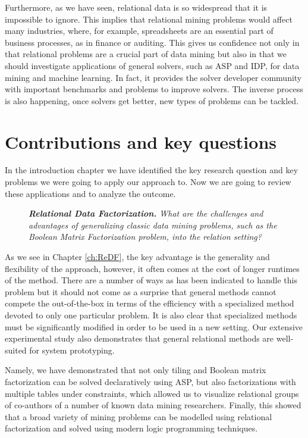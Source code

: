 Furthermore, as we have seen, relational data is so widespread that it is
impossible to ignore. This implies that relational mining problems
would affect many industries, where, for example, spreadsheets are
an essential part of business processes, as in finance or auditing.
This gives us confidence not only in that relational problems are a
crucial part of data mining but also in that we should investigate
applications of general solvers, such as ASP and IDP, for data mining
and machine learning. In fact, it provides the solver developer community
with important benchmarks and problems to improve solvers. The inverse
process is also happening, once solvers get better, new types of problems
can be tackled.

\section{Contributions and key questions}
In the introduction chapter we have identified the key research
question and key problems we were going to apply our approach to. Now
we are going to review these applications and to analyze the outcome.

\begin{description}
\item[\cone] \textit{\textbf{Relational Data Factorization.} What are the challenges and advantages of generalizing classic data mining problems, such as the Boolean Matrix
    Factorization problem, into the relation setting?}
\end{description}

As we see in Chapter \ref{ch:ReDF}, the key advantage is the
generality and flexibility of the approach, however, it often comes at
the cost of longer runtimes of the method. There are a number of ways
as has been indicated to handle this problem but it should not come as
a surprise that general methods cannot compete the out-of-the-box in
terms of the efficiency with
a specialized method devoted to only one particular problem. It is
also clear that specialized methods must be significantly modified in
order to be used in a new setting. Our extensive experimental study
also demonstrates that general relational methods are well-suited for
system prototyping.

Namely, we have demonstrated that not only tiling and Boolean matrix
factorization can be solved declaratively using ASP, but also
factorizations with multiple tables under constraints, which allowed
us to visualize relational groups of co-authors of a
number of known data mining researchers. Finally, this showed that a
broad variety of mining problems can be modelled using relational
factorization and solved using modern logic programming
techniques.

